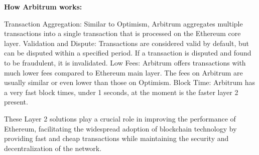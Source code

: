 \textbf{How Arbitrum works:}

Transaction Aggregation: Similar to Optimism, Arbitrum aggregates multiple transactions into a single transaction that is processed on the Ethereum core layer.
Validation and Dispute: Transactions are considered valid by default, but can be disputed within a specified period. If a transaction is disputed and found to be fraudulent, it is invalidated.
Low Fees: Arbitrum offers transactions with much lower fees compared to Ethereum main layer. The fees on Arbitrum are usually similar or even lower than those on Optimism.
Block Time: Arbitrum has a very fast block times, under 1 seconds, at the moment is the faster layer 2 present.

These Layer 2 solutions play a crucial role in improving the performance of Ethereum, facilitating the widespread adoption of blockchain technology by providing fast and cheap transactions while maintaining the security and decentralization of the network.